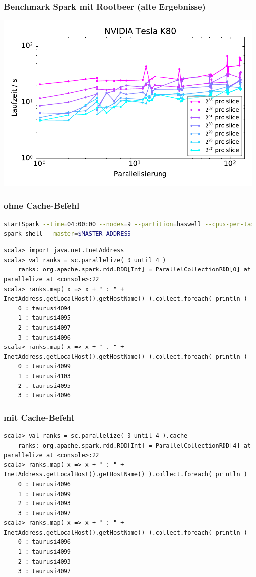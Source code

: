 \begin{frame}
    \frametitle{Benchmark Spark mit Rootbeer (alte Ergebnisse)}
    \centerline{\includegraphics[width=0.9\linewidth]{cluster-strong-scaling-gpu.pdf}}
\end{frame}


\begin{frame}[fragile]
    \frametitle{ohne Cache-Befehl}
    \begin{lstlisting}[numbers=none,language=bash]
startSpark --time=04:00:00 --nodes=9 --partition=haswell --cpus-per-task=1 --gres=''
spark-shell --master=$MASTER_ADDRESS
\end{lstlisting}\vspace{-1.5\baselineskip}
\begin{lstlisting}[numbers=none,xleftmargin=0pt,linewidth=1.1\linewidth]
scala> import java.net.InetAddress
scala> val ranks = sc.parallelize( 0 until 4 )
    ranks: org.apache.spark.rdd.RDD[Int] = ParallelCollectionRDD[0] at parallelize at <console>:22
scala> ranks.map( x => x + " : " + InetAddress.getLocalHost().getHostName() ).collect.foreach( println )
    0 : taurusi4094
    1 : taurusi4095
    2 : taurusi4097
    3 : taurusi4096
scala> ranks.map( x => x + " : " + InetAddress.getLocalHost().getHostName() ).collect.foreach( println )
    0 : taurusi4099
    1 : taurusi4103
    2 : taurusi4095
    3 : taurusi4096
\end{lstlisting}
\end{frame}


\begin{frame}[fragile]
    \frametitle{mit Cache-Befehl}
\begin{lstlisting}[numbers=none,xleftmargin=0pt,linewidth=1.1\linewidth]
scala> val ranks = sc.parallelize( 0 until 4 ).cache
    ranks: org.apache.spark.rdd.RDD[Int] = ParallelCollectionRDD[4] at parallelize at <console>:22
scala> ranks.map( x => x + " : " + InetAddress.getLocalHost().getHostName() ).collect.foreach( println )
    0 : taurusi4096
    1 : taurusi4099
    2 : taurusi4093
    3 : taurusi4097
scala> ranks.map( x => x + " : " + InetAddress.getLocalHost().getHostName() ).collect.foreach( println )
    0 : taurusi4096
    1 : taurusi4099
    2 : taurusi4093
    3 : taurusi4097
\end{lstlisting}
\end{frame}


